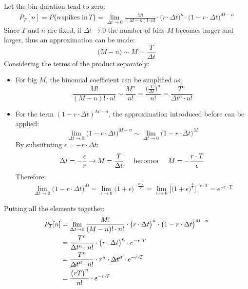 Let the bin duration tend to zero:
\begin{align*}
    P_T[n]=P\{n\,\text{spikes in}\,T\} =\lim_{\Delta{t}\to{0}}\frac{M!}{(M-n)!\cdot{n!}}\cdot{\bigl(r\cdot{\Delta{t}}\bigr)^n}\cdot{\bigl(1-r\cdot{\Delta{t}}\bigr)^{M-n}}
\end{align*}
Since \(T\) and \(n\) are fixed, if \(\Delta{t}\to{0}\) the number of bins \(M\) becomes
larger and larger, thus an approximation can be made:
\begin{equation*}
    \bigl(M-n\bigr)\sim{M}=\frac{T}{\Delta{t}}
\end{equation*}
Considering the terms of the product separately:
\begin{itemize}
    \item For big \(M\), the binomial coefficient can be simplified as:
          \begin{equation*}
              \frac{M!}{(M-n)!\cdot{n!}}
              \sim\frac{M^n}{n!}
              =\frac{\bigl(\frac{T}{\Delta{t}}\bigr)^n}{n!}
              =\frac{T^n}{\Delta{t}^n\cdot{n!}}
          \end{equation*}
    \item For the term \((1-r\cdot\Delta t)^{M-n}\), the approximation introduced before can be applied:
          \begin{equation*}
              \lim_{\Delta{t}\to{0}}\bigl(1-r\cdot{\Delta{t}}\bigr)^{M-n}
              \sim\lim_{\Delta{t}\to{0}}\bigl(1-r\cdot{\Delta{t}}\bigr)^M
          \end{equation*}
          By substituting \(\epsilon=-r\cdot\Delta t\):
          \begin{equation*}
              \Delta t=-\frac{\epsilon}{r}\rightarrow M=\frac{T}{\Delta t}\hspace{0.5cm}\text{becomes}\hspace{0.5cm} M=-\frac{r\cdot T}{\epsilon}
          \end{equation*}
          Therefore:
          \begin{align*}
              \lim_{\Delta{t}\to{0}}\bigl(1-r\cdot{\Delta{t}}\bigr)^M=\lim_{\epsilon\to{0}}\bigl(1+\epsilon\bigr)^{-\frac{r\cdot{T}}{\epsilon}}=\lim_{\epsilon\to{0}}\biggl[\bigl(1+\epsilon\bigr)^{\frac{1}{\epsilon}}\biggr]^{-r\cdot{T}}
              =e^{-r\cdot{T}}
          \end{align*}
\end{itemize}
Putting all the elements together:
\begin{align*}
    P_T[n]
     & =\lim_{\Delta{t}\to{0}}\frac{M!}{(M-n)!\cdot{n!}}\cdot{\bigl(r\cdot{\Delta{t}}\bigr)^n}\cdot{\bigl(1-r\cdot{\Delta{t}}\bigr)^{M-n}} \\
     & =\frac{T^n}{\Delta{t}^n\cdot{n!}}\cdot{\bigl(r\cdot{\Delta{t}}\bigr)^n}\cdot{e^{-r\cdot{T}}}                                        \\
     & =\frac{T^n}{\cancel{\Delta{t}^n}\cdot{n!}}\cdot{r^n\cdot{\cancel{\Delta{t}^n}}}\cdot{e^{-r\cdot{T}}}                                \\
     & =\frac{\bigl(rT\bigr)^n}{n!}\cdot{e^{-r\cdot T}}
\end{align*}
